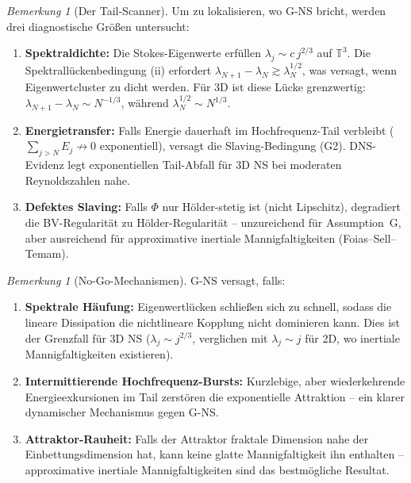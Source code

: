 \documentclass[12pt,a4paper]{article}
\theoremstyle{definition}
\theoremstyle{plain}
\theoremstyle{remark}
\newtheorem{remark}[definition]{Bemerkung}
\begin{document}
\begin{remark}[Der Tail-Scanner]\label{rem:tail-scanner}
Um zu lokalisieren, wo G-NS bricht, werden drei diagnostische Gr\"o\ss en untersucht:
\begin{enumerate}
\item \textbf{Spektraldichte:} Die Stokes-Eigenwerte erf\"ullen $\lambda_j \sim c\, j^{2/3}$ auf $\mathbb{T}^3$. Die Spektrall\"uckenbedingung (ii) erfordert $\lambda_{N+1} - \lambda_N \gtrsim \lambda_N^{1/2}$, was versagt, wenn Eigenwertcluster zu dicht werden. F\"ur 3D ist diese L\"ucke grenzwertig: $\lambda_{N+1} - \lambda_N \sim N^{-1/3}$, w\"ahrend $\lambda_N^{1/2} \sim N^{1/3}$.
\item \textbf{Energietransfer:} Falls Energie dauerhaft im Hochfrequenz-Tail verbleibt ($\sum_{j > N} E_j \not\to 0$ exponentiell), versagt die Slaving-Bedingung (G2). DNS-Evidenz legt exponentiellen Tail-Abfall f\"ur 3D NS bei moderaten Reynoldszahlen nahe.
\item \textbf{Defektes Slaving:} Falls $\Phi$ nur H\"older-stetig ist (nicht Lipschitz), degradiert die BV-Regularit\"at zu H\"older-Regularit\"at -- unzureichend f\"ur Assumption~G, aber ausreichend f\"ur approximative inertiale Mannigfaltigkeiten (Foias--Sell--Temam).
\end{enumerate}
\end{remark}

\begin{remark}[No-Go-Mechanismen]\label{rem:g-nogo}
G-NS versagt, falls:
\begin{enumerate}
\item \textbf{Spektrale H\"aufung:} Eigenwertl\"ucken schlie\ss en sich zu schnell, sodass die lineare Dissipation die nichtlineare Kopplung nicht dominieren kann. Dies ist der Grenzfall f\"ur 3D NS ($\lambda_j \sim j^{2/3}$, verglichen mit $\lambda_j \sim j$ f\"ur 2D, wo inertiale Mannigfaltigkeiten existieren).
\item \textbf{Intermittierende Hochfrequenz-Bursts:} Kurzlebige, aber wiederkehrende Energieexkursionen im Tail zerst\"oren die exponentielle Attraktion -- ein klarer dynamischer Mechanismus gegen G-NS.
\item \textbf{Attraktor-Rauheit:} Falls der Attraktor fraktale Dimension nahe der Einbettungsdimension hat, kann keine glatte Mannigfaltigkeit ihn enthalten -- approximative inertiale Mannigfaltigkeiten sind das bestm\"ogliche Resultat.
\end{enumerate}
\end{remark}
\end{document}
